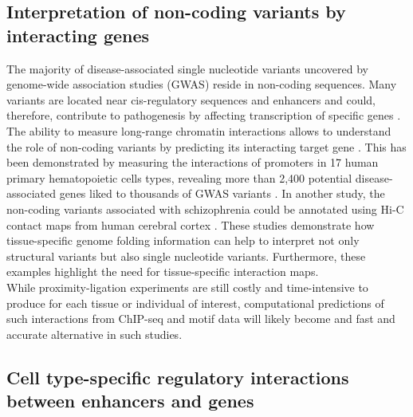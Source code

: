\documentclass[a4paper,twoside=true,openright,parskip=full,chapterprefix=true,11pt,headings=normal,bibliography=totoc,listof=totoc,titlepage=on,captions=tableabove,draft=false]{scrreprt}
\theoremstyle{definition}
\theoremstyle{definition}
\theoremstyle{definition}
\theoremstyle{remark}
\begin{document}
\hypertarget{interpretation-of-non-coding-variants-by-interacting-genes}{%
\subsection{Interpretation of non-coding variants by interacting
genes}\label{interpretation-of-non-coding-variants-by-interacting-genes}}

The majority of disease-associated single nucleotide variants uncovered
by genome-wide association studies (GWAS) reside in non-coding
sequences. Many variants are located near cis-regulatory sequences and
enhancers and could, therefore, contribute to pathogenesis by affecting
transcription of specific genes \citep{Hindorff2009}. The ability to
measure long-range chromatin interactions allows to understand the role
of non-coding variants by predicting its interacting target gene
\citep{Smemo2014, Visser2012}. This has been demonstrated by measuring
the interactions of promoters in 17 human primary hematopoietic cells
types, revealing more than 2,400 potential disease-associated genes
liked to thousands of GWAS variants \citep{Javierre2016}. In another
study, the non-coding variants associated with schizophrenia could be
annotated using Hi-C contact maps from human cerebral cortex
\citep{Won2016}. These studies demonstrate how tissue-specific genome
folding information can help to interpret not only structural variants
but also single nucleotide variants. Furthermore, these examples
highlight the need for tissue-specific interaction maps.\\
While proximity-ligation experiments are still costly and time-intensive
to produce for each tissue or individual of interest, computational
predictions of such interactions from ChIP-seq and motif data will
likely become and fast and accurate alternative in such studies.

\hypertarget{cell-type-specific-regulatory-interactions-between-enhancers-and-genes}{%
\subsection{Cell type-specific regulatory interactions between enhancers
and
genes}\label{cell-type-specific-regulatory-interactions-between-enhancers-and-genes}}
\end{document}
